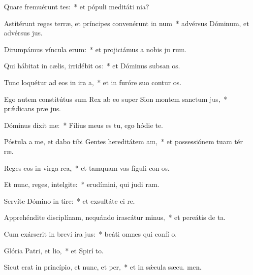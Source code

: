 \item Quare fremuérunt tes:~* et pópuli meditáti  nia?
\item Astitérunt reges terræ, et príncipes convenérunt in num~* advérsus Dóminum, et advérsus  jus.
\item Dirumpámus víncula erum:~* et projiciámus a nobis ju rum.
\item Qui hábitat in cælis, irridébit os:~* et Dóminus subsan os.
\item Tunc loquétur ad eos in ira a,~* et in furóre suo contur os.
\item Ego autem constitútus sum Rex ab eo super Sion montem sanctum jus,~* prǽdicans præ jus.
\item Dóminus dixit  me:~* Fílius meus es tu, ego hódie  te.
\item Póstula a me, et dabo tibi Gentes hereditátem am,~* et possessiónem tuam tér ræ.
\item Reges eos in virga rea,~* et tamquam vas fíguli con os.
\item Et nunc, reges, intelgite:~* erudímini, qui judi ram.
\item Servíte Dómino in tire:~* et exsultáte ei  re.
\item Apprehéndite disciplínam, nequándo irascátur minus,~* et pereátis de  ta.
\item Cum exárserit in brevi ira jus:~* beáti omnes qui confí  o.
\item Glória Patri, et lio,~* et Spirí to.
\item Sicut erat in princípio, et nunc, et per,~* et in sǽcula sæcu. men.
